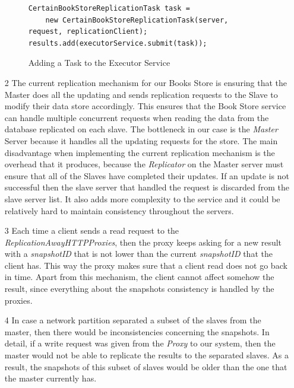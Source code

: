 \documentclass{article}      %
\begin{document}
\begin{itemize}
\begin{figure}[htbp]
\begin{center}
\begin{lstlisting}
CertainBookStoreReplicationTask task = 
	new CertainBookStoreReplicationTask(server, request, replicationClient);
results.add(executorService.submit(task));
\end{lstlisting}
\caption{Adding a Task to the Executor Service}
\label{Adding a Task to the Executor Service}
\end{center}
\end{figure}



\item[2] The current replication mechanism for our Books Store is ensuring that the Master does all the updating and sends replication requests to the Slave to modify their data store accordingly. This ensures that the Book Store service can handle multiple concurrent requests when reading the data from the database replicated on each slave. The bottleneck in our case is the \emph{Master} Server because it handles all the updating requests for the store. The main disadvantage when implementing the current replication mechanism is the overhead that it produces, because the \emph{Replicator} on the Master server must ensure that all of the Slaves have completed their updates. If an update is not successful then the slave server that handled the request is discarded from the slave server list. It also adds more complexity to the service and it could be relatively hard to maintain consistency throughout the servers. 

\item[3] Each time a client sends a read request to the \emph{ReplicationAwayHTTPProxies}, then the proxy keeps asking for a new result with a \emph{snapshotID} that is not lower than the current \emph{snapshotID} that the client has. This way the proxy makes sure that a client read does not go back in time. Apart from this mechanism, the client cannot affect somehow the result, since everything about the snapshots consistency is handled by the proxies.

\item[4] In case a network partition separated a subset of the slaves from the master, then there would be inconsistencies concerning the snapshots. In detail, if a write request was given from the \emph{Proxy} to our system, then the master would not be able to replicate the results to the separated slaves. As a result, the snapshots of this subset of slaves would be older than the one that the master currently has.

 

\end{itemize}
\end{document}
